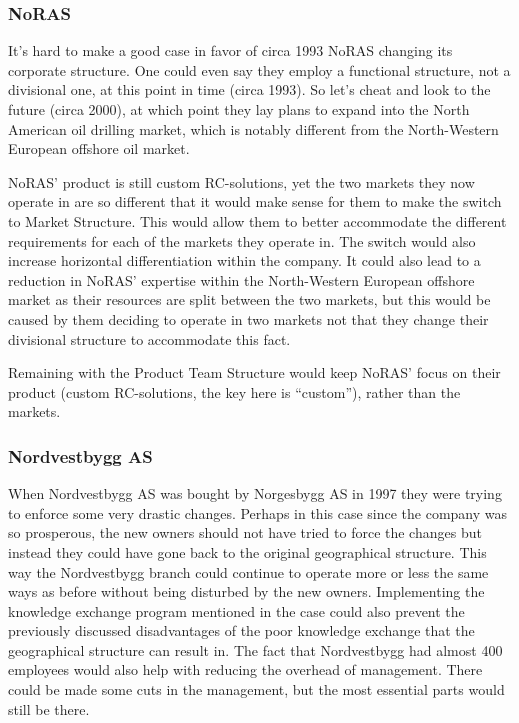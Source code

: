 \documentclass[a4paper]{article}
\begin{document}
    \subsubsection{NoRAS} It's hard to make a good case in favor of circa 1993
    NoRAS changing its corporate structure. One could even say they employ a
    functional structure, not a divisional one, at this point in time (circa
    1993). So let's cheat and look to the future (circa 2000), at which point
    they lay plans to expand into the North American oil drilling market,
    which is notably different from the North-Western European offshore oil
    market.

    NoRAS' product is still custom RC-solutions, yet the two markets they now
    operate in are so different that it would make sense for them to make the
    switch to Market Structure. This would allow them to better accommodate
    the different requirements for each of the markets they operate in.
    The switch would also increase horizontal differentiation within the
    company. It could also lead to a reduction in NoRAS' expertise within
    the North-Western European offshore market as their resources are split
    between the two markets, but this would be caused by them deciding to
    operate in two markets not that they change their divisional structure to
    accommodate this fact.

    Remaining with the Product Team Structure would keep NoRAS' focus on their
    product (custom RC-solutions, the key here is ``custom''), rather than the
    markets.

    \subsubsection{Nordvestbygg AS} When Nordvestbygg AS was bought by
    Norgesbygg AS in 1997 they were trying to enforce some very drastic
    changes. Perhaps in this case since the company was so prosperous, the
    new owners should not have tried to force the changes but instead they
    could have gone back to the original geographical structure. This way
    the Nordvestbygg branch could continue to operate more or less the same
    ways as before without being disturbed by the new owners. Implementing
    the knowledge exchange program mentioned in the case could also prevent
    the previously discussed disadvantages of the poor knowledge exchange
    that the geographical structure can result in. The fact that Nordvestbygg
    had almost 400 employees would also help with reducing the overhead of
    management. There could be made some cuts in the management, but the most
    essential parts would still be there.
\end{document}
